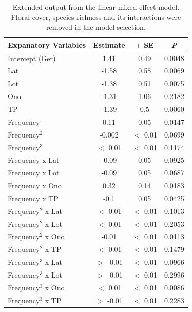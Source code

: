 \begin{table} [!htbp]
	\centering
	\caption{Extended output from the linear mixed effect model. Floral cover, species richness and its interactions were removed in the model selection.}
	\begin{tabular}{lccc}
		\toprule
		\textbf{Expanatory Variables} & \textbf{Estimate} & \textbf{$\pm$ SE} &  \textbf{\textit{P}} \\
		\midrule
		Intercept (Ger) & 1.41 & 0.49  & 0.0048 \\ 
		Lat	& -1.58 & 0.58 & 0.0069 \\ 
		Lot	& -1.38 & 0.51 & 0.0075 \\ 
		Ono	& -1.31 & 1.06 & 0.2182 \\ 
		TP	& -1.39 & 0.5  & 0.0060 \\ 
		\addlinespace[0.2cm]
		Frequency	& 0.11 & 0.05 & 0.0147 \\
		Frequency$^{2}$	& -0.002 &  $<$ 0.01 & 0.0699 \\ 
		Frequency$^{3}$	& $<$ 0.01 & $<$ 0.01 & 0.1174 \\ 
		\addlinespace[0.2cm]
		Frequency x Lat	& -0.09 & 0.05 & 0.0925 \\
		Frequency x Lot	& -0.09 &  0.05 & 0.0687 \\ 
		Frequency x Ono	& 0.32 & 0.14 & 0.0183 \\ 
		Frequency x TP	& -0.1 & 0.05 & 0.0425 \\
		\addlinespace[0.2cm] 
		Frequency$^{2}$ x Lat	& $<$ 0.01 & $<$ 0.01 & 0.1013 \\
		Frequency$^{2}$ x Lot	& $<$ 0.01 & $<$ 0.01 & 0.2053 \\ 
		Frequency$^{2}$ x Ono	& -0.01 & $<$ 0.01 & 0.0113 \\ 
		Frequency$^{2}$ x TP	& $<$ 0.01 & $<$ 0.01 & 0.1479 \\ 
		\addlinespace[0.2cm]
		Frequency$^{3}$ x Lat	& $>$ -0.01 & $<$ 0.01 & 0.0966 \\
		Frequency$^{3}$ x Lot	& $>$ -0.01 & $<$ 0.01 & 0.2996 \\ 
		Frequency$^{3}$ x Ono	& $<$ 0.01 & $<$ 0.01 & 0.0086 \\ 
		Frequency$^{3}$ x TP	& $>$ -0.01 & $<$ 0.01 & 0.2283 \\
		\bottomrule
	\end{tabular}
	\label{tab:summary} 
\end{table}

\clearpage
{}
\thispagestyle{empty}

